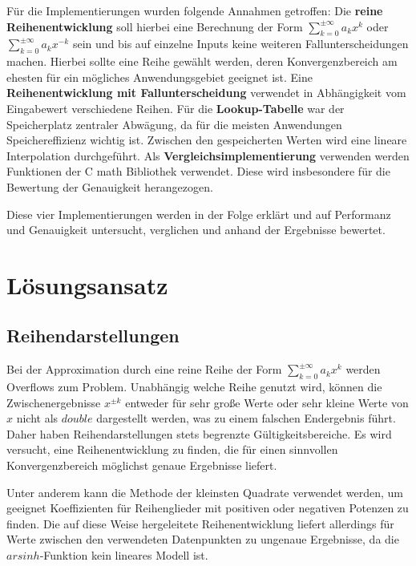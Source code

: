 \documentclass[course=erap] {aspdoc}
\begin{document}
    Für die Implementierungen wurden folgende Annahmen getroffen:
    Die \textbf{reine Reihenentwicklung} soll hierbei eine Berechnung der Form $\sum_{k=0}^{\pm\infty} a_k x^k$ oder $\sum_{k=0}^{\pm\infty} a_k x^{-k}$ sein und bis auf einzelne Inputs keine weiteren Fallunterscheidungen machen.
    Hierbei sollte eine Reihe gewählt werden, deren Konvergenzbereich am ehesten für ein mögliches Anwendungsgebiet geeignet ist.
    Eine \textbf{Reihenentwicklung mit Fallunterscheidung} verwendet in Abhängigkeit vom Eingabewert verschiedene Reihen.
    Für die \textbf{Lookup-Tabelle} war der Speicherplatz zentraler Abwägung, da für die meisten Anwendungen Speichereffizienz wichtig ist.
    Zwischen den gespeicherten Werten wird eine lineare Interpolation durchgeführt.
    Als \textbf{Vergleichsimplementierung} verwenden werden Funktionen der C math Bibliothek verwendet.
    Diese wird insbesondere für die Bewertung der Genauigkeit herangezogen.

    Diese vier Implementierungen werden in der Folge erklärt und auf Performanz und Genauigkeit untersucht, verglichen und anhand der Ergebnisse bewertet.


    \section{Lösungsansatz}\label{sec:losungsansatz}

    \subsection{Reihendarstellungen}\label{subsec:reihendarstellung}

    Bei der Approximation durch eine reine Reihe der Form $\sum_{k=0}^{\pm\infty} a_k x^k$ werden Overflows zum Problem.
    Unabhängig welche Reihe genutzt wird, können die Zwischenergebnisse $x^{\pm k}$ entweder für sehr große Werte oder sehr kleine Werte von $x$ nicht als $double$ dargestellt werden, was zu einem falschen Endergebnis führt.
    Daher haben Reihendarstellungen stets begrenzte Gültigkeitsbereiche.
    Es wird versucht, eine Reihenentwicklung zu finden, die für einen sinnvollen Konvergenzbereich möglichst genaue Ergebnisse liefert.

    Unter anderem kann die Methode der kleinsten Quadrate verwendet werden, um geeignet Koeffizienten für Reihenglieder mit positiven oder negativen Potenzen zu finden.
    Die auf diese Weise hergeleitete Reihenentwicklung liefert allerdings für Werte zwischen den verwendeten Datenpunkten zu ungenaue Ergebnisse, da die $arsinh$-Funktion kein lineares Modell ist.
\end{document}
